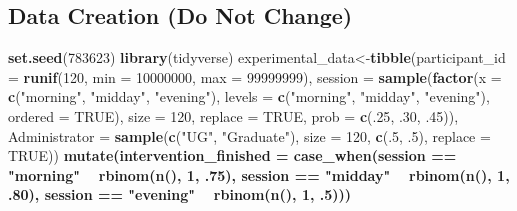 \documentclass[]{book}
\newenvironment{Shaded}{\begin{snugshade}}{\end{snugshade}}
\newcommand{\DataTypeTok}[1]{\textcolor[rgb]{0.13,0.29,0.53}{#1}}
\newcommand{\DecValTok}[1]{\textcolor[rgb]{0.00,0.00,0.81}{#1}}
\newcommand{\FloatTok}[1]{\textcolor[rgb]{0.00,0.00,0.81}{#1}}
\newcommand{\KeywordTok}[1]{\textcolor[rgb]{0.13,0.29,0.53}{\textbf{#1}}}
\newcommand{\NormalTok}[1]{#1}
\newcommand{\OperatorTok}[1]{\textcolor[rgb]{0.81,0.36,0.00}{\textbf{#1}}}
\newcommand{\OtherTok}[1]{\textcolor[rgb]{0.56,0.35,0.01}{#1}}
\newcommand{\StringTok}[1]{\textcolor[rgb]{0.31,0.60,0.02}{#1}}
\theoremstyle{definition}
\theoremstyle{definition}
\theoremstyle{definition}
\theoremstyle{remark}
\begin{document}
\hypertarget{data-creation-do-not-change-1}{%
\subsection{Data Creation (Do Not Change)}\label{data-creation-do-not-change-1}}

\begin{Shaded}
\begin{Highlighting}[]
\KeywordTok{set.seed}\NormalTok{(}\DecValTok{783623}\NormalTok{)}
\KeywordTok{library}\NormalTok{(tidyverse)}
\NormalTok{experimental_data<-}\KeywordTok{tibble}\NormalTok{(}\DataTypeTok{participant_id =} \KeywordTok{runif}\NormalTok{(}\DecValTok{120}\NormalTok{, }\DataTypeTok{min =} \DecValTok{10000000}\NormalTok{, }\DataTypeTok{max =} \DecValTok{99999999}\NormalTok{),}
  \DataTypeTok{session =} \KeywordTok{sample}\NormalTok{(}\KeywordTok{factor}\NormalTok{(}\DataTypeTok{x =} \KeywordTok{c}\NormalTok{(}\StringTok{"morning"}\NormalTok{, }\StringTok{"midday"}\NormalTok{, }\StringTok{"evening"}\NormalTok{), }\DataTypeTok{levels =} \KeywordTok{c}\NormalTok{(}\StringTok{"morning"}\NormalTok{, }\StringTok{"midday"}\NormalTok{, }\StringTok{"evening"}\NormalTok{), }\DataTypeTok{ordered =} \OtherTok{TRUE}\NormalTok{), }\DataTypeTok{size =} \DecValTok{120}\NormalTok{, }\DataTypeTok{replace =} \OtherTok{TRUE}\NormalTok{, }\DataTypeTok{prob =} \KeywordTok{c}\NormalTok{(.}\DecValTok{25}\NormalTok{, }\FloatTok{.30}\NormalTok{, }\FloatTok{.45}\NormalTok{)),}
          \DataTypeTok{Administrator =} \KeywordTok{sample}\NormalTok{(}\KeywordTok{c}\NormalTok{(}\StringTok{"UG"}\NormalTok{, }\StringTok{"Graduate"}\NormalTok{), }\DataTypeTok{size =} \DecValTok{120}\NormalTok{, }\KeywordTok{c}\NormalTok{(.}\DecValTok{5}\NormalTok{, }\FloatTok{.5}\NormalTok{), }\DataTypeTok{replace =} \OtherTok{TRUE}\NormalTok{))}\OperatorTok{%
\StringTok{  }\KeywordTok{mutate}\NormalTok{(}\DataTypeTok{intervention_finished =} \KeywordTok{case_when}\NormalTok{(session }\OperatorTok{==}\StringTok{ "morning"} \OperatorTok{~}\StringTok{ }\KeywordTok{rbinom}\NormalTok{(}\KeywordTok{n}\NormalTok{(), }\DecValTok{1}\NormalTok{, }\FloatTok{.75}\NormalTok{),}
\NormalTok{                               session }\OperatorTok{==}\StringTok{ "midday"} \OperatorTok{~}\StringTok{ }\KeywordTok{rbinom}\NormalTok{(}\KeywordTok{n}\NormalTok{(), }\DecValTok{1}\NormalTok{, }\FloatTok{.80}\NormalTok{), }
\NormalTok{                               session }\OperatorTok{==}\StringTok{ "evening"} \OperatorTok{~}\StringTok{ }\KeywordTok{rbinom}\NormalTok{(}\KeywordTok{n}\NormalTok{(), }\DecValTok{1}\NormalTok{, }\FloatTok{.5}\NormalTok{)))}\OperatorTok{%
}}
\end{Highlighting}
\end{Shaded}
\end{document}
